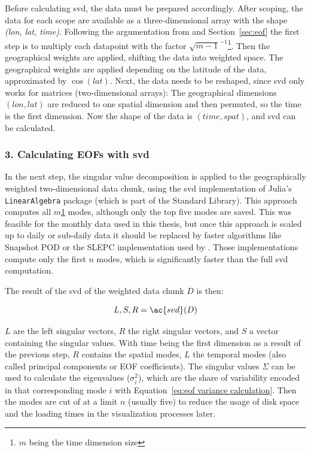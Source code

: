 Before calculating \ac{svd}, the data must be prepared accordingly. 
After scoping, the data for each scope are available as a three-dimensional array with the shape \textit{(lon, lat, time)}.
Following the argumentation from \cite{vietinghoffdiss} and Section~\ref{sec:eof} the first step is to multiply each datapoint with the factor $\sqrt{m-1}^{-1}$\footnote{\label{timesize}$m$ being the time dimension size}. 
Then the geographical weights are applied, shifting the data into weighted space. 
The geographical weights are applied depending on the latitude of the data, approximated by $\cos(lat)$. 
Next, the data needs to be reshaped, since \ac{svd} only works for matrices (two-dimensional arrays): The geographical dimensions $(lon, lat)$ are reduced to one spatial dimension and then permuted, so the time is the first dimension. 
Now the shape of the data is $(time, spat)$, and \ac{svd} can be calculated. 

\subsubsection{3. Calculating EOFs with \ac{svd}}

In the next step, the singular value decomposition is applied to the geographically weighted two-dimensional data chunk, using the \ac{svd} implementation of Julia's \texttt{Linear\-Algebra} package (which is part of the Standard Library). 
This approach computes all $m$\cref{timesize} modes, although only the top five modes are saved.
This was feasible for the monthly data used in this thesis, but once this approach is scaled up to daily or sub-daily data it should be replaced by faster algorithms like Snapshot POD or the SLEPC implementation used by .
Those implementations compute only the first $n$ modes, which is significantly faster than the full \ac{svd} computation. 

The result of the \ac{svd} of the weighted data chunk $D$ is then:

\begin{equation}
\label{eq:SVD}
L,S,R = \ac{svd}(D)
\end{equation}

$L$ are the left singular vectors, $R$ the right singular vectors, and $S$ a vector containing the singular values. 
With time being the first dimension as a result of the previous step, $R$ contains the spatial modes, $L$ the temporal modes (also called principal components or EOF coefficients). 
The singular values $\Sigma$ can be used to calculate the eigenvalues ($\sigma_i^2$), which are the share of variability encoded in that corresponding mode $i$ with Equation~\ref{eq:eof variance calculation}. 
Then the modes are cut of at a limit $n$ (usually five) to reduce the usage of disk space and the loading times in the visualization processes later. 


